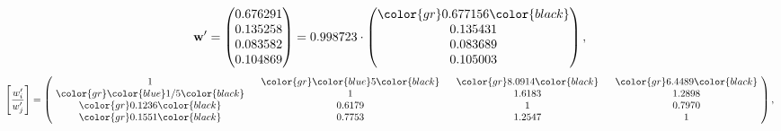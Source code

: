 \begin{example}
\begin{equation*}
\mathbf{w}^{\prime} =
\begin{pmatrix}
0.676291\\
0.135258\\
0.083582\\
0.104869
\end{pmatrix} =
0.998723\cdot
\begin{pmatrix}
\color{gr} 0.677156\color{black} \\
0.135431\\
0.083689\\
0.105003
\end{pmatrix},
\end{equation*}
\begin{equation*}
\left[ \frac{{w}^{\prime}_i}{{w}^{\prime}_j} \right] =
\begin{pmatrix}
$\,\,$ 1 $\,\,$ & $\,\,$\color{gr} \color{blue} 5\color{black} $\,\,$ & $\,\,$\color{gr} 8.0914\color{black} $\,\,$ & $\,\,$\color{gr} 6.4489\color{black} $\,\,$ \\
$\,\,$\color{gr} \color{blue}  1/5\color{black} $\,\,$ & $\,\,$ 1 $\,\,$ & $\,\,$1.6183$\,\,$ & $\,\,$1.2898  $\,\,$ \\
$\,\,$\color{gr} 0.1236\color{black} $\,\,$ & $\,\,$0.6179$\,\,$ & $\,\,$ 1 $\,\,$ & $\,\,$0.7970 $\,\,$ \\
$\,\,$\color{gr} 0.1551\color{black} $\,\,$ & $\,\,$0.7753$\,\,$ & $\,\,$1.2547$\,\,$ & $\,\,$ 1  $\,\,$ \\
\end{pmatrix},
\end{equation*}
\end{example}
\newpage
